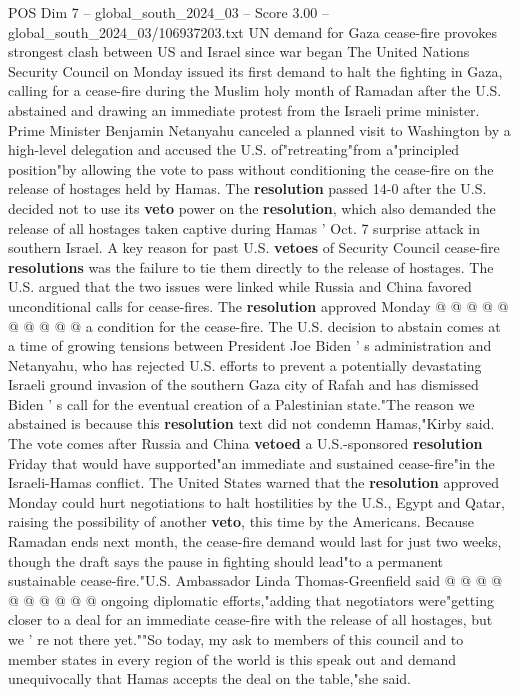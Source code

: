 \begin{textsample}{POS Dim 7 – global\_south\_2024\_03 – Score 3.00 – global\_south\_2024\_03/106937203.txt}  \label{ex:f7_pos_023}
UN demand for Gaza cease-fire provokes strongest clash between US and Israel since war began The United Nations Security Council on Monday issued its first demand to halt the fighting in Gaza, calling for a cease-fire during the Muslim holy month of Ramadan after the U.S. abstained and drawing an immediate protest from the Israeli prime minister.
Prime Minister Benjamin Netanyahu canceled a planned visit to Washington by a high-level delegation and accused the U.S. of"retreating"from a"principled position"by allowing the vote to pass without conditioning the cease-fire on the release of hostages held by Hamas.
The \textbf{resolution} passed 14-0 after the U.S. decided not to use its \textbf{veto} power on the \textbf{resolution}, which also demanded the release of all hostages taken captive during Hamas ' Oct. 7 surprise attack in southern Israel.
A key reason for past U.S. \textbf{vetoes} of Security Council cease-fire \textbf{resolutions} was the failure to tie them directly to the release of hostages.
The U.S. argued that the two issues were linked while Russia and China favored unconditional calls for cease-fires.
The \textbf{resolution} approved Monday @ @ @ @ @ @ @ @ @ @ a condition for the cease-fire.
The U.S. decision to abstain comes at a time of growing tensions between President Joe Biden ' s administration and Netanyahu, who has rejected U.S. efforts to prevent a potentially devastating Israeli ground invasion of the southern Gaza city of Rafah and has dismissed Biden ' s call for the eventual creation of a Palestinian state."The reason we abstained is because this \textbf{resolution} text did not condemn Hamas,"Kirby said.
The vote comes after Russia and China \textbf{vetoed} a U.S.-sponsored \textbf{resolution} Friday that would have supported"an immediate and sustained cease-fire"in the Israeli-Hamas conflict.
The United States warned that the \textbf{resolution} approved Monday could hurt negotiations to halt hostilities by the U.S., Egypt and Qatar, raising the possibility of another \textbf{veto}, this time by the Americans.
Because Ramadan ends next month, the cease-fire demand would last for just two weeks, though the draft says the pause in fighting should lead"to a permanent sustainable cease-fire."U.S.
Ambassador Linda Thomas-Greenfield said @ @ @ @ @ @ @ @ @ @ ongoing diplomatic efforts,"adding that negotiators were"getting closer to a deal for an immediate cease-fire with the release of all hostages, but we ' re not there yet.""So today, my ask to members of this council and to member states in every region of the world is this speak out and demand unequivocally that Hamas accepts the deal on the table,"she said.

\end{textsample}
